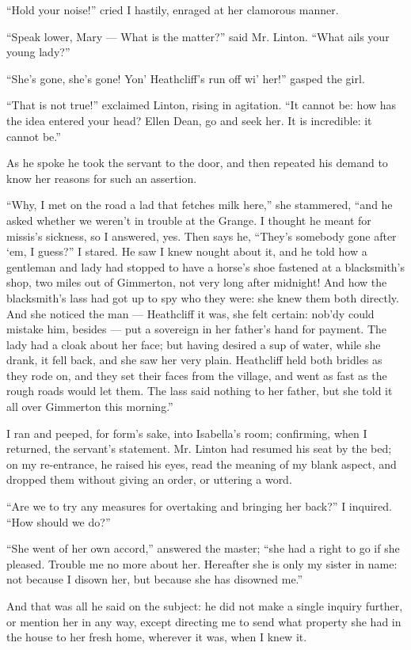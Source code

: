 \par “Hold your noise!” cried I hastily, enraged at her clamorous manner.
\par “Speak lower, Mary — What is the matter?” said Mr. Linton. “What ails your young lady?”
\par “She's gone, she's gone! Yon' Heathcliff's run off wi' her!” gasped the girl.
\par “That is not true!” exclaimed Linton, rising in agitation. “It cannot be: how has the idea entered your head? Ellen Dean, go and seek her. It is incredible: it cannot be.”
\par As he spoke he took the servant to the door, and then repeated his demand to know her reasons for such an assertion.
\par “Why, I met on the road a lad that fetches milk here,” she stammered, “and he asked whether we weren't in trouble at the Grange. I thought he meant for missis's sickness, so I answered, yes. Then says he, “They's somebody gone after ‘em, I guess?” I stared. He saw I knew nought about it, and he told how a gentleman and lady had stopped to have a horse's shoe fastened at a blacksmith's shop, two miles out of Gimmerton, not very long after midnight! And how the blacksmith's lass had got up to spy who they were: she knew them both directly. And she noticed the man — Heathcliff it was, she felt certain: nob'dy could mistake him, besides — put a sovereign in her father's hand for payment. The lady had a cloak about her face; but having desired a sup of water, while she drank, it fell back, and she saw her very plain. Heathcliff held both bridles as they rode on, and they set their faces from the village, and went as fast as the rough roads would let them. The lass said nothing to her father, but she told it all over Gimmerton this morning.”
\par I ran and peeped, for form's sake, into Isabella's room; confirming, when I returned, the servant's statement. Mr. Linton had resumed his seat by the bed; on my re-entrance, he raised his eyes, read the meaning of my blank aspect, and dropped them without giving an order, or uttering a word.
\par “Are we to try any measures for overtaking and bringing her back?” I inquired. “How should we do?”
\par “She went of her own accord,” answered the master; “she had a right to go if she pleased. Trouble me no more about her. Hereafter she is only my sister in name: not because I disown her, but because she has disowned me.”
\par And that was all he said on the subject: he did not make a single inquiry further, or mention her in any way, except directing me to send what property she had in the house to her fresh home, wherever it was, when I knew it.








